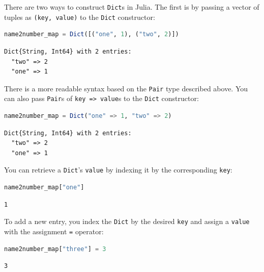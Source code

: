 \documentclass[
  notoc %
]{tufte-book}
\newcommand{\passthrough}[1]{#1}
\begin{document}
There are two ways to construct \passthrough{\lstinline!Dict!}s in
Julia. The first is by passing a vector of tuples as
\passthrough{\lstinline!(key, value)!} to the
\passthrough{\lstinline!Dict!} constructor:

\begin{lstlisting}[language=Julia]
name2number_map = Dict([("one", 1), ("two", 2)])
\end{lstlisting}

\begin{lstlisting}[language=Output]
Dict{String, Int64} with 2 entries:
  "two" => 2
  "one" => 1
\end{lstlisting}

There is a more readable syntax based on the
\passthrough{\lstinline!Pair!} type described above. You can also pass
\passthrough{\lstinline!Pair!}s of
\passthrough{\lstinline!key => value!}s to the
\passthrough{\lstinline!Dict!} constructor:

\begin{lstlisting}[language=Julia]
name2number_map = Dict("one" => 1, "two" => 2)
\end{lstlisting}

\begin{lstlisting}[language=Output]
Dict{String, Int64} with 2 entries:
  "two" => 2
  "one" => 1
\end{lstlisting}

You can retrieve a \passthrough{\lstinline!Dict!}'s
\passthrough{\lstinline!value!} by indexing it by the corresponding
\passthrough{\lstinline!key!}:

\begin{lstlisting}[language=Julia]
name2number_map["one"]
\end{lstlisting}

\begin{lstlisting}[language=Output]
1
\end{lstlisting}

To add a new entry, you index the \passthrough{\lstinline!Dict!} by the
desired \passthrough{\lstinline!key!} and assign a
\passthrough{\lstinline!value!} with the assignment
\passthrough{\lstinline!=!} operator:

\begin{lstlisting}[language=Julia]
name2number_map["three"] = 3
\end{lstlisting}

\begin{lstlisting}[language=Output]
3
\end{lstlisting}
\end{document}
